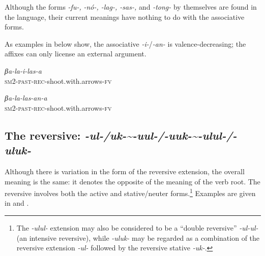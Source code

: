 \documentclass[output=paper		  ]{langscibook}
\begin{document}
{Although the forms} {\textit{{}-fu-,}} {\textit{{}-nó-, -lag-, -sas-,} }{and} {\textit{-tong-}} {by themselves are found in the language, their current meanings have nothing to do with the associative forms.}

As examples in  below show, the associative {\textit{{}-i-}}/{\textit{{}-an-}} is valence-decreasing; the affixes can only license an external argument.

\ea\label{ex:kahigi:18}

    \ea\label{ex:kahigi:18a} \gll \textit{βa-la-i-las-a}\\
    \textsc{sm2-past-rec-}shoot.with.arrows-\textsc{fv}\\

    \ex\label{ex:kahigi:18b} \gll \textit{βa-la-las-an-a}\\
    \textsc{sm2-past-rec-}shoot.with.arrows-\textsc{fv}\\ 
    \z
\z


\subsection{The reversive: \textit{-ul-/uk-{\textasciitilde}-uul-/-uuk-{\textasciitilde}-ulul-/-uluk-}}
\label{sec:kahigi:2.8}

Although there is variation in the form of the reversive extension, the overall meaning is the same: it denotes the opposite of the meaning of the verb root. The reversive involves both the active and stative/neuter forms.\footnote{The \textit{{}-ulul-} extension may also be considered to be a “double reversive” \textit{{}-ul-ul-} (an intensive reversive), while \textit{{}-uluk-} may be regarded as a combination of the reversive extension \textit{{}-ul-} followed by the reversive stative \textit{{}-uk-}.} Examples are given in  and .
\end{document}
